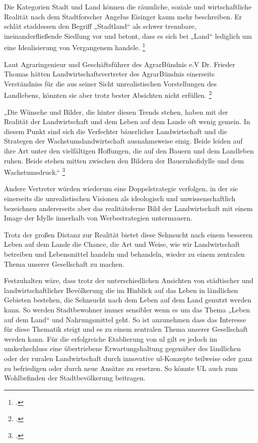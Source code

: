 \documentclass{scrartcl}
\begin{document}
Die Kategorien Stadt und Land können die räumliche, soziale und wirtschaftliche Realität nach dem Stadtforscher Angelus Eisinger kaum mehr beschreiben. Er schlät staddessen den Begriff „Stadtland“ als schwer trennbare, ineinanderfließende Siedlung vor und betont, dass es sich bei „Land“ lediglich um eine Idealisierung von Vergangenem handele. \footcite[Vgl.][S. 40]{Egnolff2015DieIdeal}

Laut Agraringenieur und Geschäftsführer des AgrarBündnis e.V Dr. Frieder Thomas hätten Landwirtschaftsvertreter des AgrarBündnis einerseits Verständniss für die aus seiner Sicht unrealistischen Vorstellungen des Landlebens, könnten sie aber trotz bester Absichten nicht erfüllen. \footcite[Vgl.][S. 27]{Thomas2015BauerlichkeitBegriff}

\begin{displayquote}
„Die Wünsche und Bilder, die hinter diesen Trends stehen, haben mit der Realität der Landwirtschaft und dem Leben auf dem Lande oft wenig gemein. In diesem Punkt sind sich die Verfechter bäuerlicher Landwirtschaft und die Strategen der Wachstumslandwirtschaft ausnahmsweise einig. Beide leiden auf ihre Art unter den vielfältigen Hoffungen, die auf den Bauern und dem Landleben ruhen. Beide stehen mitten zwischen den Bildern der Bauernhofidylle und dem Wachstumsdruck.“ \footcite[S. 27]{Thomas2015BauerlichkeitBegriff}
\end{displayquote}

Andere Vertreter würden wiederum eine Doppelstrategie verfolgen, in der sie einerseits die unrealistischen Visionen als ideologisch und unwissenschaftlich bezeichnen andererseits aber das realitätsferne Bild der Landwirtschaft mit einem Image der Idylle innerhalb von Werbestrategien untermauern.

Trotz der großen Distanz zur Realität bietet diese Sehnsucht nach einem besseren Leben auf dem Lande die Chance, die Art und Weise, wie wir Landwirtschaft betreiben und Lebensmittel handeln und behandeln, wieder zu einem zentralen Thema unserer Gesellschaft zu machen.

Festzuhalten wäre, dass trotz der unterschiedlichen Ansichten von städtischer und landwirtschaftlicher Bevölkerung die im Hinblick auf das Leben in ländlichen Gebieten bestehen, die Sehnsucht nach dem Leben auf dem Land genutzt werden kann. So werden Stadtbewohner immer sensibler wenn es um das Thema „Leben auf dem Land“ und Nahrungsmittel geht. So ist anzunehmen dass das Interesse für diese Thematik steigt und es zu einem zentralen Thema unserer Gesellschaft werden kann. Für die erfolgreiche Etablierung von \acs{ul} gilt es jedoch im umkerhschluss eine übertriebene Erwartungshaltung gegenüber des ländlichen oder der ruralen Landwirtschaft durch innovative \acs{ul}-Konzepte teilweise oder ganz zu befriedigen oder durch neue Ansätze zu ersetzen. So könnte UL auch zum Wohlbefinden der Stadtbevölkerung beitragen.
\end{document}
